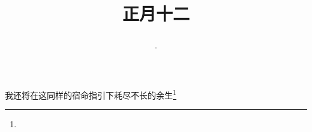 \title{\date[d=21,m=2,y=2024][year:cn-y,年,month:cn,day:cn,日,·,weekday]·正月十二 }
我还将在这同样的宿命指引下耗尽不长的余生\footnote{ }

